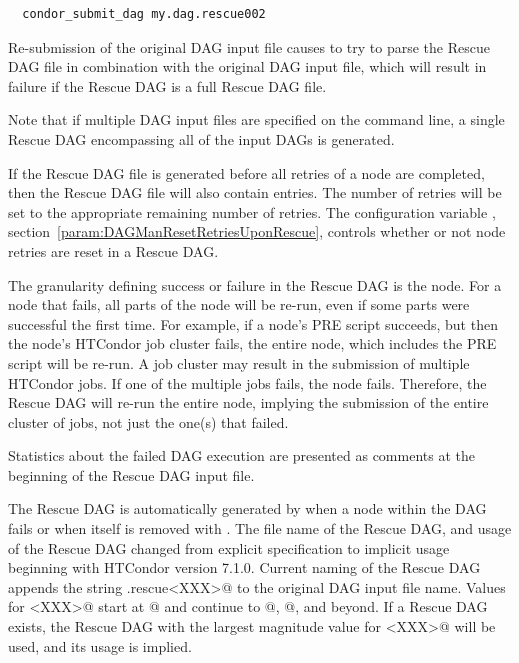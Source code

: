 \begin{verbatim}
  condor_submit_dag my.dag.rescue002
\end{verbatim}

Re-submission of the original DAG input file causes  to try to
parse the Rescue DAG file in combination with the original DAG input file, 
which will result in failure if the Rescue DAG is a full Rescue DAG file.

Note that if multiple DAG input files are specified on the
 command line,
a single Rescue DAG encompassing all of the input DAGs is generated.

If the Rescue DAG file is generated before all retries
of a node are completed, 
then the Rescue DAG file will also contain  entries.
The number of retries will be set to the appropriate remaining
number of retries.
The configuration variable , 
section~\ref{param:DAGManResetRetriesUponRescue},
controls whether or not node retries are reset in a Rescue DAG.

The granularity defining success or failure
in the Rescue DAG is the node.
For a node that fails,
all parts of the node will be re-run,
even if some parts were successful the first time.
For example, if a node's PRE script
succeeds, but then the node's HTCondor job cluster fails,
the entire node, which includes the PRE script will be re-run.
A job cluster may result in the submission of multiple HTCondor jobs.
If one of the multiple jobs fails, the node fails.
Therefore, the Rescue DAG will
re-run the entire node,
implying the submission of the entire cluster of jobs,
not just the one(s) that failed.

Statistics about the failed DAG execution are presented as
comments at the beginning of the Rescue DAG input file.

The Rescue DAG is automatically generated by  when a node
within the DAG fails or when  itself is removed
with .
The file name of the Rescue DAG, and usage of the Rescue
DAG changed from explicit specification to implicit usage
beginning with HTCondor version 7.1.0.
Current naming of the Rescue DAG appends the string
\verb@.rescue<XXX>@ to the original DAG input file name.
Values for \verb@<XXX>@ start at @ and continue
to @, @, and beyond.
If a Rescue DAG exists,
the Rescue DAG with the largest magnitude value for \verb@<XXX>@
will be used, and its usage is implied.


